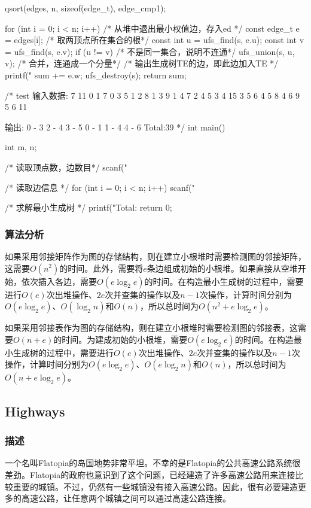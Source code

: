 \begin{Codex}[label=kruskal.c]
{    qsort(edges, n, sizeof(edge_t), edge_cmp1);

    for (int i = 0; i < n; i++) {
        /* 从堆中退出最小权值边，存入ed */
        const edge_t e = edges[i];
        /* 取两顶点所在集合的根*/
        const int u = ufs_find(s, e.u);
        const int v = ufs_find(s, e.v);
        if (u != v) { /* 不是同一集合，说明不连通*/
            ufs_union(s, u, v); /* 合并，连通成一个分量*/
            /* 输出生成树TE的边，即此边加入TE */
            printf("%
            sum += e.w;
        }
    }
    ufs_destroy(s);
    return sum;
}

/* test
输入数据:
7 11
0 1 7
0 3 5
1 2 8
1 3 9
1 4 7
2 4 5
3 4 15
3 5 6
4 5 8
4 6 9
5 6 11

输出:
0 - 3
2 - 4
3 - 5
0 - 1
1 - 4
4 - 6
Total:39
*/
int main() {
    int m, n;

    /* 读取顶点数，边数目*/
    scanf("%

    /* 读取边信息 */
    for (int i = 0; i < n; i++) {
        scanf("%
    }

    /* 求解最小生成树 */
    printf("Total:%
    return 0;
}
\end{Codex}

\subsubsection{算法分析}
如果采用邻接矩阵作为图的存储结构，则在建立小根堆时需要检测图的邻接矩阵，这需要$O(n^2)$的时间。此外，需要将$e$条边组成初始的小根堆。如果直接从空堆开始，依次插入各边，需要$O(e\log_2e)$的时间。在构造最小生成树的过程中，需要进行$O(e)$次出堆操作、$2e$次并查集的操作以及$n-1$次操作，计算时间分别为$O(e\log_2e)$、$O(\log_2n)$和$O(n)$，所以总时间为$O(n^2+e\log_2e)$。

如果采用邻接表作为图的存储结构，则在建立小根堆时需要检测图的邻接表，这需要$O(n+e)$的时间。为建成初始的小根堆，需要$O(e\log_2e)$的时间。在构造最小生成树的过程中，需要进行$O(e)$次出堆操作、$2e$次并查集的操作以及$n-1$次操作，计算时间分别为$O(e\log_2e)$、$O(e\log_2n)$和$O(n)$，所以总时间为$O(n+e\log_2e)$。


\subsection{Highways}
\subsubsection{描述}
一个名叫Flatopia的岛国地势非常平坦。不幸的是Flatopia的公共高速公路系统很差劲。Flatopia的政府也意识到了这个问题，已经建造了许多高速公路用来连接比较重要的城镇。不过，仍然有一些城镇没有接入高速公路。因此，很有必要建造更多的高速公路，让任意两个城镇之间可以通过高速公路连接。

